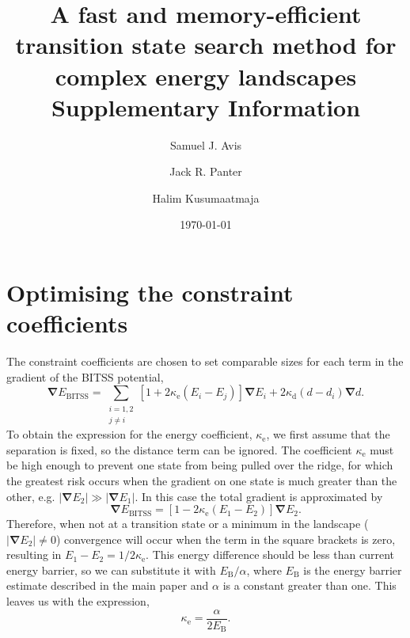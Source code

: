 \documentclass[aip,jcp,11pt]{revtex4-2}
\newcommand{\abs}[1]{\left| #1 \right|}
\newcommand{\grad}{\bm{\nabla}}
\begin{document}
\title{A fast and memory-efficient transition state search method for complex energy landscapes \\ Supplementary Information}
\author{Samuel J. Avis}
\author{Jack R. Panter}
\author{Halim Kusumaatmaja}
\date{\today}
\maketitle

\section{Optimising the constraint coefficients}
The constraint coefficients are chosen to set comparable sizes for each term in the gradient of the BITSS potential,
\begin{equation}
  \grad E_\text{BITSS} = \sum_{\substack{i=1,2 \\ j\neq i}} \left[ 1 + 2 \kappa_\text{e} (E_i - E_j) \right] \grad E_i + 2 \kappa_\text{d} (d - d_i) \grad d.
\end{equation}
To obtain the expression for the energy coefficient, $\kappa_\text{e}$, we first assume that the separation is fixed, so the distance term can be ignored.
The coefficient $\kappa_\text{e}$ must be high enough to prevent one state from being pulled over the ridge, for which the greatest risk occurs when the gradient on one state is much greater than the other, e.g. $\abs{\grad E_2} \gg \abs{\grad E_1}$.
In this case the total gradient is approximated by
\begin{equation}
  \grad E_\text{BITSS} = \left[ 1 - 2 \kappa_\text{e} (E_1 - E_2) \right] \grad E_2.
\end{equation}
Therefore, when not at a transition state or a minimum in the landscape ($\abs{\grad E_2} \neq 0$) convergence will occur when the term in the square brackets is zero, resulting in $E_1 - E_2 = 1 / 2 \kappa_\text{e}$.
This energy difference should be less than current energy barrier, so we can substitute it with $E_\text{B} / \alpha$, where $E_\text{B}$ is the energy barrier estimate described in the main paper and $\alpha$ is a constant greater than one.
This leaves us with the expression,
\begin{equation}
  \kappa_\text{e} = \frac {\alpha} {2 E_\text{B}}.
\end{equation}
\end{document}
